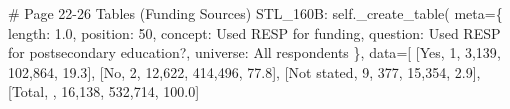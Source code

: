 \documentclass[
  11pt,
  a4paper,
]{article}
\newenvironment{Shaded}{\begin{snugshade}}{\end{snugshade}}
\newcommand{\CommentTok}[1]{\textcolor[rgb]{0.37,0.37,0.37}{#1}}
\newcommand{\NormalTok}[1]{\textcolor[rgb]{0.00,0.23,0.31}{#1}}
\newcommand{\OperatorTok}[1]{\textcolor[rgb]{0.37,0.37,0.37}{#1}}
\newcommand{\StringTok}[1]{\textcolor[rgb]{0.13,0.47,0.30}{#1}}
\newcommand{\VariableTok}[1]{\textcolor[rgb]{0.07,0.07,0.07}{#1}}
\begin{document}
\begin{Shaded}
\begin{Highlighting}[]
            \CommentTok{\# Page 22{-}26 Tables (Funding Sources)}
            \StringTok{\textquotesingle{}STL\_160B\textquotesingle{}}\NormalTok{: }\VariableTok{self}\NormalTok{.\_create\_table(}
\NormalTok{                meta}\OperatorTok{=}\NormalTok{\{}
                    \StringTok{\textquotesingle{}length\textquotesingle{}}\NormalTok{: }\StringTok{\textquotesingle{}1.0\textquotesingle{}}\NormalTok{, }\StringTok{\textquotesingle{}position\textquotesingle{}}\NormalTok{: }\StringTok{\textquotesingle{}50\textquotesingle{}}\NormalTok{,}
                    \StringTok{\textquotesingle{}concept\textquotesingle{}}\NormalTok{: }\StringTok{\textquotesingle{}Used RESP for funding\textquotesingle{}}\NormalTok{,}
                    \StringTok{\textquotesingle{}question\textquotesingle{}}\NormalTok{: }\StringTok{\textquotesingle{}Used RESP for postsecondary education?\textquotesingle{}}\NormalTok{,}
                    \StringTok{\textquotesingle{}universe\textquotesingle{}}\NormalTok{: }\StringTok{\textquotesingle{}All respondents\textquotesingle{}}
\NormalTok{                \},}
\NormalTok{                data}\OperatorTok{=}\NormalTok{[}
\NormalTok{                    [}\StringTok{\textquotesingle{}Yes\textquotesingle{}}\NormalTok{, }\StringTok{\textquotesingle{}1\textquotesingle{}}\NormalTok{, }\StringTok{\textquotesingle{}3,139\textquotesingle{}}\NormalTok{, }\StringTok{\textquotesingle{}102,864\textquotesingle{}}\NormalTok{, }\StringTok{\textquotesingle{}19.3\textquotesingle{}}\NormalTok{],}
\NormalTok{                    [}\StringTok{\textquotesingle{}No\textquotesingle{}}\NormalTok{, }\StringTok{\textquotesingle{}2\textquotesingle{}}\NormalTok{, }\StringTok{\textquotesingle{}12,622\textquotesingle{}}\NormalTok{, }\StringTok{\textquotesingle{}414,496\textquotesingle{}}\NormalTok{, }\StringTok{\textquotesingle{}77.8\textquotesingle{}}\NormalTok{],}
\NormalTok{                    [}\StringTok{\textquotesingle{}Not stated\textquotesingle{}}\NormalTok{, }\StringTok{\textquotesingle{}9\textquotesingle{}}\NormalTok{, }\StringTok{\textquotesingle{}377\textquotesingle{}}\NormalTok{, }\StringTok{\textquotesingle{}15,354\textquotesingle{}}\NormalTok{, }\StringTok{\textquotesingle{}2.9\textquotesingle{}}\NormalTok{],}
\NormalTok{                    [}\StringTok{\textquotesingle{}Total\textquotesingle{}}\NormalTok{, }\StringTok{\textquotesingle{}\textquotesingle{}}\NormalTok{, }\StringTok{\textquotesingle{}16,138\textquotesingle{}}\NormalTok{, }\StringTok{\textquotesingle{}532,714\textquotesingle{}}\NormalTok{, }\StringTok{\textquotesingle{}100.0\textquotesingle{}}\NormalTok{]}

\end{Highlighting}
\end{Shaded}
\end{document}
